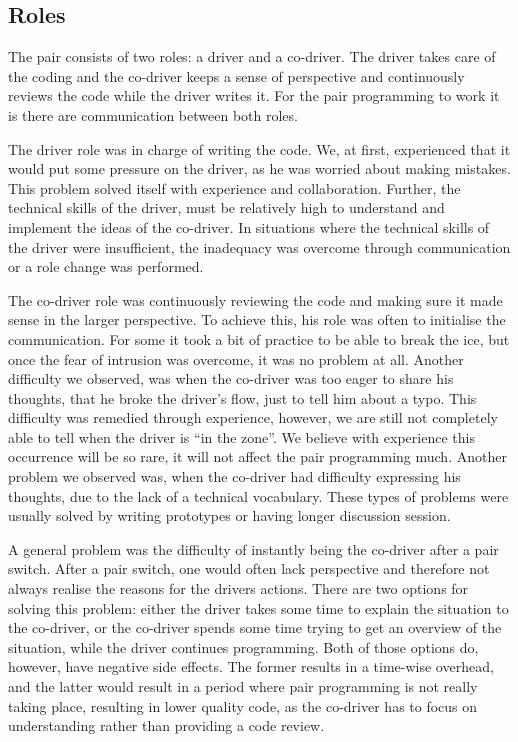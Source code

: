 \subsection{Roles}
The pair consists of two roles: a driver and a co-driver.
The driver takes care of the coding and the co-driver keeps a sense of perspective and continuously reviews the code while the driver writes it.
For the pair programming to work it is there are communication between both roles.

The driver role was in charge of writing the code.
We, at first, experienced that it would put some pressure on the driver, as he was worried about making mistakes.
This problem solved itself with experience and collaboration.
Further, the technical skills of the driver, must be relatively high to understand and implement the ideas of the co-driver.
In situations where the technical skills of the driver were insufficient, the inadequacy was overcome through communication or a role change was performed.

The co-driver role was continuously reviewing the code and making sure it made sense in the larger perspective.
To achieve this, his role was often to initialise the communication.
For some it took a bit of practice to be able to break the ice, but once the fear of intrusion was overcome, it was no problem at all.
Another difficulty we observed, was when the co-driver was too eager to share his thoughts, that he broke the driver's flow, just to tell him about a typo.
This difficulty was remedied through experience, however, we are still not completely able to tell when the driver is ``in the zone''.
We believe with experience this occurrence will be so rare, it will not affect the pair programming much.
Another problem we observed was, when the co-driver had difficulty expressing his thoughts, due to the lack of a technical vocabulary.
These types of problems were usually solved by writing prototypes or having longer discussion session.

A general problem was the difficulty of instantly being the co-driver after a pair switch.
After a pair switch, one would often lack perspective and therefore not always realise the reasons for the drivers actions.
There are two options for solving this problem: either the driver takes some time to explain the situation to the co-driver, or the co-driver spends some time trying to get an overview of the situation, while the driver continues programming.
Both of those options do, however, have  negative side effects.
The former results in a time-wise overhead, and the latter would result in a period where pair programming is not really taking place, resulting in lower quality code, as the co-driver has to focus on understanding rather than providing a code review.

